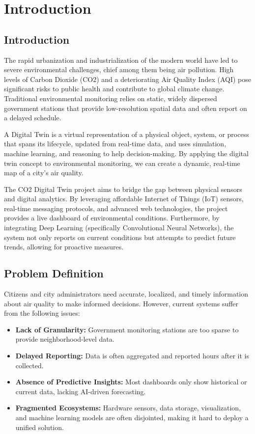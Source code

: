 \documentclass[a4paper, 12pt]{report}
\begin{document}
\chapter{Introduction}
\section{Introduction}
The rapid urbanization and industrialization of the modern world have led to severe environmental challenges, chief among them being air pollution. High levels of Carbon Dioxide (CO2) and a deteriorating Air Quality Index (AQI) pose significant risks to public health and contribute to global climate change. Traditional environmental monitoring relies on static, widely dispersed government stations that provide low-resolution spatial data and often report on a delayed schedule.

A Digital Twin is a virtual representation of a physical object, system, or process that spans its lifecycle, updated from real-time data, and uses simulation, machine learning, and reasoning to help decision-making. By applying the digital twin concept to environmental monitoring, we can create a dynamic, real-time map of a city's air quality.

The CO2 Digital Twin project aims to bridge the gap between physical sensors and digital analytics. By leveraging affordable Internet of Things (IoT) sensors, real-time messaging protocols, and advanced web technologies, the project provides a live dashboard of environmental conditions. Furthermore, by integrating Deep Learning (specifically Convolutional Neural Networks), the system not only reports on current conditions but attempts to predict future trends, allowing for proactive measures.

\section{Problem Definition}
Citizens and city administrators need accurate, localized, and timely information about air quality to make informed decisions. However, current systems suffer from the following issues:
\begin{itemize}
    \item \textbf{Lack of Granularity:} Government monitoring stations are too sparse to provide neighborhood-level data.
    \item \textbf{Delayed Reporting:} Data is often aggregated and reported hours after it is collected.
    \item \textbf{Absence of Predictive Insights:} Most dashboards only show historical or current data, lacking AI-driven forecasting.
    \item \textbf{Fragmented Ecosystems:} Hardware sensors, data storage, visualization, and machine learning models are often disjointed, making it hard to deploy a unified solution.
\end{itemize}
\end{document}
